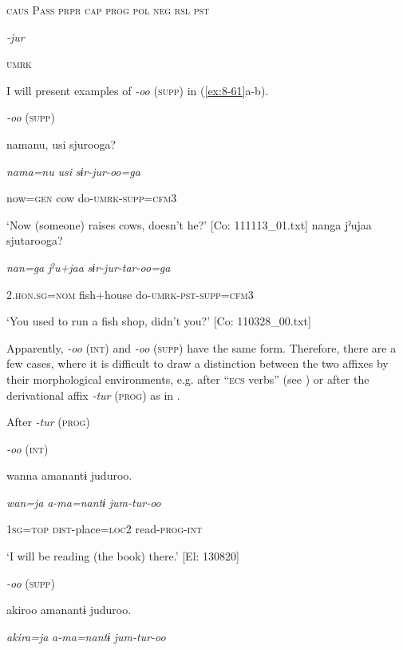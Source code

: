     \textsc{caus}  P\textsc{ass}  \textsc{prpr}  \textsc{cap}  \textsc{prog}  \textsc{pol}  \textsc{neg}  \textsc{rsl}  \textsc{pst}

          \textit{{}-jur} 

          \textsc{umrk}

I will present examples of \textit{{}-oo} (\textsc{supp}) in (\ref{ex:8-61}a-b).

\ea\label{ex:8-61}
  \textit{{}-oo} (\textsc{supp})

\ea {\TM}
\glll  namanu,  usi  sjurooga?

      \textit{nama=nu}  \textit{usi}  \textit{sɨr-jur-oo=ga}

      now=\textsc{gen}  cow  do-\textsc{umrk}-\textsc{supp}=\textsc{cfm}3

\glt ‘Now (someone) raises cows, doesn’t he?’ [Co: 111113\_01.txt]
\ex {\TM}
\glll  nanga  jˀujaa  sjutarooga?

      \textit{nan=ga}  \textit{jˀu+jaa}  \textit{sɨr-jur-tar-oo=ga}

      2.\textsc{hon}.\textsc{sg}=\textsc{nom}  fish+house  do-\textsc{umrk}-\textsc{pst}-\textsc{supp}=\textsc{cfm}3

\glt ‘You used to run a fish shop, didn’t you?’ [Co: 110328\_00.txt]
\z

  Apparently, \textit{-oo} (\textsc{int}) and \textit{{}-oo} (\textsc{supp}) have the same form. Therefore, there are a few cases, where it is difficult to draw a distinction between the two affixes by their morphological environments, e.g. after “\textsc{ecs} verbs” (see ) or after the derivational affix \textit{{}-tur} (\textsc{prog}) as in .

\ea\label{ex:8-62}
  After \textit{{}-tur} (\textsc{prog})

\ea \textit{{}-oo} (\textsc{int})

    {\TM}
\glll  wanna  amanantɨ  juduroo.

      \textit{wan=ja}  \textit{a-ma=nantɨ}  \textit{jum-tur-oo}

      1\textsc{sg}=\textsc{top}  \textsc{dist}-place=\textsc{loc}2  read-\textsc{prog}-\textsc{int}

\glt ‘I will be reading (the book) there.’ [El: 130820]

\ex \textit{{}-oo} (\textsc{supp})

    {\TM}
\glll  akiroo  amanantɨ  juduroo.

      \textit{akira=ja}  \textit{a-ma=nantɨ}  \textit{jum-tur-oo}

